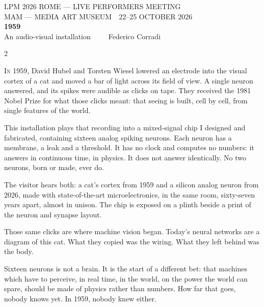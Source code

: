 \documentclass[11pt]{article}
\newcommand{\kicker}[1]{{\fontsize{10.5}{14}\selectfont\color{faint}%
  \addfontfeature{LetterSpace=12.0}\MakeUppercase{#1}}}
\newcommand{\hruleink}{\par\vspace{1.5em}{\color{spike}\rule{\linewidth}{0.55pt}}\par\vspace{1.5em}}
\begin{document}
\begin{center}
  {\kicker{LPM 2026 Rome — Live Performers Meeting}}\\[0.5em]
  {\kicker{MAM — Media Art Museum \,\textbar\, 22--25 October 2026}}\\[2.2em]
  {\fontsize{142}{126}\selectfont\bfseries\color{spike}1959}\\[1.7em]
  {\fontsize{21}{26}\selectfont An audio-visual installation\ \ \textperiodcentered\ \ \ Federico Corradi}
\end{center}
\vspace{0.5em}
\hruleink

\begin{paracol}{2}

\fontsize{14.2}{18.8}\selectfont

\lettrine[lines=2,findent=2pt,nindent=0pt]{I}{n} 1959, David Hubel and Torsten
Wiesel lowered an electrode into the visual cortex of a cat and moved a bar of
light across its field of view. A single neuron answered, and its spikes were
audible as clicks on tape. They received the 1981 Nobel Prize for what those
clicks meant: that seeing is built, cell by cell, from single features of the
world.

This installation plays that recording into a mixed-signal chip I designed and
fabricated, containing sixteen analog spiking neurons. Each neuron has a
membrane, a leak and a threshold. It has no clock and computes no numbers: it
answers in continuous time, in physics. It does not answer identically. No two
neurons, born or made, ever do.

The visitor hears both: a cat's cortex from 1959 and a silicon analog neuron
from 2026, made with state-of-the-art microelectronics, in the same room,
sixty-seven years apart, almost in unison. The chip is exposed on a plinth
beside a print of the neuron and synapse layout.

Those same clicks are where machine vision began. Today's neural networks are
a diagram of this cat. What they copied was the wiring. What they left behind
was the body.

Sixteen neurons is not a brain. It is the start of a different bet: that
machines which have to perceive, in real time, in the world, on the power the
world can spare, should be made of physics rather than numbers. How far that
goes, nobody knows yet. In 1959, nobody knew either.


\end{paracol}
\end{document}
